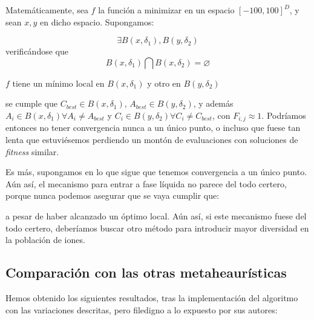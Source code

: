 \documentclass[a4paper,11pt]{article}
\let\emptyset\varnothing
\begin{document}
  Matemáticamente, sea $f$ la función a minimizar en un espacio $[-100,100]^D$, y sean $x,y$ en dicho espacio. Supongamos:
  
  $$\exists B(x,\delta_1), B(y, \delta_2)$$ verificándose que $$B(x,\delta_1) \bigcap B(x,\delta_2) = \emptyset $$
  
  $f$ tiene un mínimo local en $B(x,\delta_1)$ y otro en $B(y,\delta_2)$
  
  se cumple que $C_{best}\in B(x,\delta_1)$, $A_{best}\in B(y,\delta_2)$, y además $A_i\in B(x,\delta_1) \forall A_i \neq A_{best}$ 
  y $C_i\in B(y,\delta_2) \forall C_i \neq C_{best}$, con $F_{i,j} \approx 1$. Podríamos entonces no tener convergencia
  nunca a un único punto, o incluso que fuese tan lenta que estuviésemos perdiendo un montón de evaluaciones con soluciones
  de \textit{fitness} similar.
  
  Es más, supongamos en lo que sigue que tenemos convergencia a un único punto. Aún así, el mecanismo para entrar
  a fase líquida no parece del todo certero, porque nunca podemos asegurar que se vaya  cumplir que:
  
  \small{\texttt{}}
  \normalsize
  
  a pesar de haber alcanzado un óptimo local. Aún así, si este mecanismo fuese del todo certero, deberíamos buscar otro método
  para introducir mayor diversidad en la población de iones.
 
 \subsection{Comparación con las otras metaheaurísticas}
 
 Hemos obtenido los siguientes resultados, tras la implementación del algoritmo con las variaciones descritas, pero filedigno
 a lo expuesto por sus autores:
 
\end{document}
